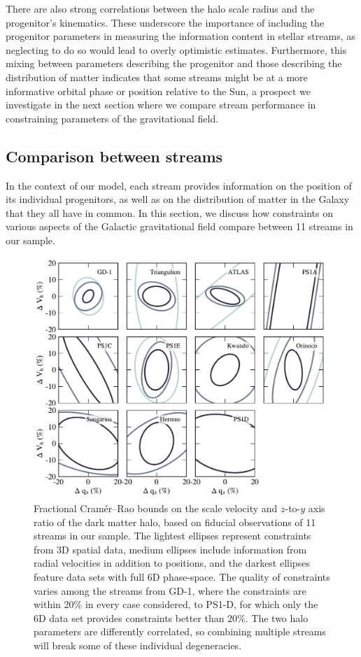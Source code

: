 \documentclass[modern]{aastex61}
\begin{document}
There are also strong correlations between the halo scale radius and the progenitor's kinematics.
These underscore the importance of including the progenitor parameters in measuring the information content in stellar streams, as neglecting to do so would lead to overly optimistic estimates.
Furthermore, this mixing between parameters describing the progenitor and those describing the distribution of matter indicates that some streams might be at a more informative orbital phase or position relative to the Sun, a prospect we investigate in the next section where we compare stream performance in constraining parameters of the gravitational field.

\subsection{Comparison between streams}
\label{sec:res_comp}
In the context of our model, each stream provides information on the position of its individual progenitors, as well as on the distribution of matter in the Galaxy that they all have in common.
In this section, we discuss how constraints on various aspects of the Galactic gravitational field compare between 11 streams in our sample.

\begin{figure}
\begin{center}
\includegraphics[width=\textwidth]{crb2d_allstream.pdf}
\caption{Fractional Cram\'er--Rao bounds on the scale velocity and $z$-to-$y$ axis ratio of the dark matter halo, based on fiducial observations of 11 streams in our sample.
The lightest ellipses represent constraints from 3D spatial data, medium ellipses include information from radial velocities in addition to positions, and the darkest ellipses feature data sets with full 6D phase-space.
The quality of constraints varies among the streams from GD-1, where the constraints are within 20\% in every case considered, to PS1-D, for which only the 6D data set provides constraints better than 20\%.
The two halo parameters are differently correlated, so combining multiple streams will break some of these individual degeneracies.
}
\label{fig:crb2d_comparison}
\end{center}
\end{figure}
\end{document}
